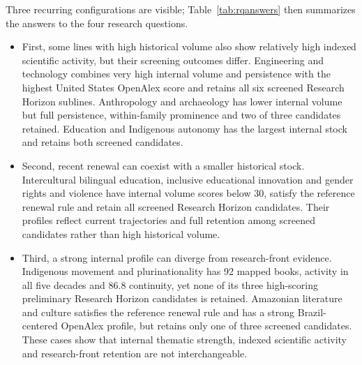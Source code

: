 \documentclass[futureinternet,article,submit,moreauthors]{Definitions/mdpi}
\begin{document}
Three recurring configurations are visible; Table~\ref{tab:rqanswers} then summarizes the answers to the four research questions.
\begin{itemize}
\item First, some lines with high historical volume also show relatively high indexed scientific activity, but their screening outcomes differ. Engineering and technology combines very high internal volume and persistence with the highest United States OpenAlex score and retains all six screened Research Horizon sublines. Anthropology and archaeology has lower internal volume but full persistence, within-family prominence and two of three candidates retained. Education and Indigenous autonomy has the largest internal stock and retains both screened candidates.

\item Second, recent renewal can coexist with a smaller historical stock. Intercultural bilingual education, inclusive educational innovation and gender rights and violence have internal volume scores below 30, satisfy the reference renewal rule and retain all screened Research Horizon candidates. Their profiles reflect current trajectories and full retention among screened candidates rather than high historical volume.

\item Third, a strong internal profile can diverge from research-front evidence. Indigenous movement and plurinationality has 92 mapped books, activity in all five decades and 86.8 continuity, yet none of its three high-scoring preliminary Research Horizon candidates is retained. Amazonian literature and culture satisfies the reference renewal rule and has a strong Brazil-centered OpenAlex profile, but retains only one of three screened candidates. These cases show that internal thematic strength, indexed scientific activity and research-front retention are not interchangeable.
\end{itemize}
\end{document}
